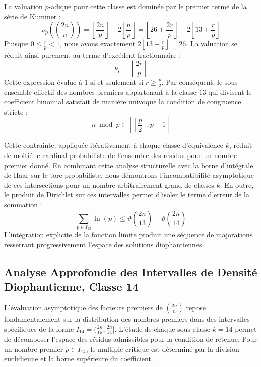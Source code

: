 \documentclass[12pt,a4paper]{article}
\begin{document}
    La valuation $p$-adique pour cette classe est dominée par le premier terme de la série de Kummer :
    \begin{equation}
    \nu_p\left( \binom{2n}{n} \right) = \left\lfloor \frac{2n}{p} \right\rfloor - 2 \left\lfloor \frac{n}{p} \right\rfloor = \left\lfloor 26 + \frac{2r}{p} \right\rfloor - 2 \left\lfloor 13 + \frac{r}{p} \right\rfloor
    \end{equation}
    Puisque $0 \le \frac{r}{p} < 1$, nous avons exactement $2 \left\lfloor 13 + \frac{r}{p} \right\rfloor = 26$.
    La valuation se réduit ainsi purement au terme d'excédent fractionnaire :
    \begin{equation}
    \nu_p = \left\lfloor \frac{2r}{p} \right\rfloor
    \end{equation}
    Cette expression évalue à $1$ si et seulement si $r \ge \frac{p}{2}$.
    Par conséquent, le sous-ensemble effectif des nombres premiers appartenant à la classe $13$ qui divisent le coefficient binomial satisfait de manière univoque la condition de congruence stricte :
    \begin{equation}
    n \bmod p \in \left[ \left\lceil \frac{p}{2} \right\rceil, p - 1 \right]
    \end{equation}

    Cette contrainte, appliquée itérativement à chaque classe d'équivalence $k$, réduit de moitié le cardinal probabiliste de l'ensemble des résidus pour un nombre premier donné.
    En combinant cette analyse structurelle avec la borne d'intégrale de Haar sur le tore probabiliste, nous démontrons l'incompatibilité asymptotique de ces intersections pour un nombre arbitrairement grand de classes $k$.
    En outre, le produit de Dirichlet sur ces intervalles permet d'isoler le terme d'erreur de la sommation :
    \begin{equation}
    \sum_{p \in I_13} \ln(p) \le \vartheta\left(\frac{2n}{13}\right) - \vartheta\left(\frac{2n}{14}\right)
    \end{equation}
    L'intégration explicite de la fonction limite produit une séquence de majorations resserrant progressivement l'espace des solutions diophantiennes.
    
    \newpage
    \subsection{Analyse Approfondie des Intervalles de Densité Diophantienne, Classe 14}
    L'évaluation asymptotique des facteurs premiers de $\binom{2n}{n}$ repose fondamentalement sur la distribution des nombres premiers dans des intervalles spécifiques de la forme $I_14 = (\frac{2n}{15}, \frac{2n}{14}]$.
    L'étude de chaque sous-classe $k = 14$ permet de décomposer l'espace des résidus admissibles pour la condition de retenue.
    Pour un nombre premier $p \in I_14$, le multiple critique est déterminé par la division euclidienne et la borne supérieure du coefficient.
\end{document}
